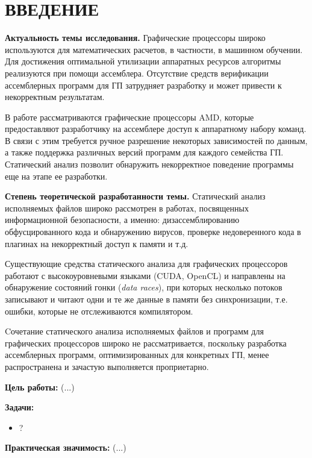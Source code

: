 \documentclass[a4paper,14pt]{extarticle}
\newcommand{\topic}[2]{\textbf{#1.} #2\newline}
\newenvironment{ul}{\begin{itemize}[noitemsep,topsep=0em]}{\end{itemize}\vspace{4mm}}
\begin{document}
\tableofcontents
\newpage

\section*{ВВЕДЕНИЕ}

\topic{Актуальность темы исследования}{Графические процессоры широко используются
для математических расчетов, в частности, в машинном обучении. Для достижения оптимальной
утилизации аппаратных ресурсов алгоритмы реализуются при помощи ассемблера.
Отсутствие средств верификации ассемблерных программ для ГП затрудняет разработку
и может привести к некорректным результатам.

В работе рассматриваются графические процессоры AMD, которые предоставляют разработчику
на ассемблере доступ к аппаратному набору команд. В связи с этим требуется ручное
разрешение некоторых зависимостей по данным, а также поддержка различных версий программ
для каждого семейства ГП. Статический анализ позволит обнаружить некорректное
поведение программы еще на этапе ее разработки.}

\topic{Степень теоретической разработанности темы}{Статический анализ исполняемых файлов
широко рассмотрен в работах, посвященных информационной безопасности, а именно:
дизассемблированию обфусцированного кода и обнаружению вирусов,
проверке недоверенного кода в плагинах на некорректный доступ к памяти и т.д.\cite{static-analysis-binary}

Существующие средства статического анализа для графических процессоров работают с
высокоуровневыми языками (CUDA, OpenCL) и направлены на обнаружение состояний
гонки (\textit{data races}), при которых несколько потоков записывают
и читают одни и те же данные в памяти без синхронизации, т.е. ошибки, которые
не отслеживаются компилятором\cite{gpu-static-verification}.

Cочетание статического анализа исполняемых файлов и программ для графических
процессоров широко не рассматривается, поскольку разработка ассемблерных программ,
оптимизированных для конкретных ГП, менее распространена и зачастую выполняется
проприетарно.}

\textbf{Цель работы:} (...)

\textbf{Задачи:}
\begin{ul}
\item ?
\end{ul}

\textbf{Практическая значимость:} (...)
\end{document}
